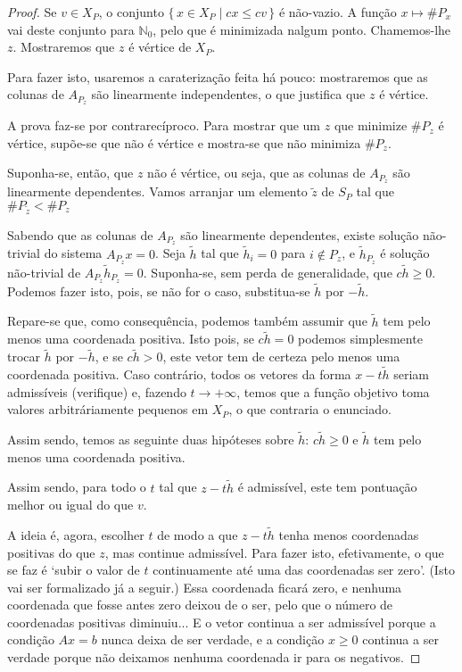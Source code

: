 \documentclass{article}
\newcommand{\N}{\mathbb{N}}
\theoremstyle{definition}
\begin{document}
	\begin{proof}
	Se $v \in X_P$, o conjunto $\{\,x \in X_P \mid cx \leq cv\,\}$ é não-vazio. A função $x \mapsto \#P_x$ vai deste conjunto para $\N_0$, pelo que é minimizada nalgum ponto. Chamemos-lhe $z$. Mostraremos que $z$ é vértice de $X_P$.
	
	Para fazer isto, usaremos a caraterização feita há pouco: mostraremos que as colunas de $A_{P_z}$ são linearmente independentes, o que justifica que $z$ é vértice.
	
	A prova faz-se por contrarecíproco. Para mostrar que um $z$ que minimize $\#P_z$ é vértice, supõe-se que não é vértice e mostra-se que não minimiza $\#P_z$.
	
	Suponha-se, então, que $z$ não é vértice, ou seja, que as colunas de $A_{P_z}$ são linearmente dependentes. Vamos arranjar um elemento $\tilde z$ de $S_P$ tal que $\#P_{\tilde z} < \#P_z$
	
	Sabendo que as colunas de $A_{P_z}$ são linearmente dependentes, existe solução não-trivial do sistema $A_{P_z} x = 0$. Seja $\tilde h$ tal que $\tilde h_i = 0$ para $i \not \in P_z$, e $\tilde h_{P_z}$ é solução não-trivial de $A_{P_z} \tilde h_{P_z} = 0$. Suponha-se, sem perda de generalidade, que $c \tilde h \geq 0$. Podemos fazer isto, pois, se não for o caso, substitua-se $\tilde h$ por $-\tilde h$.
	
	Repare-se que, como consequência, podemos também assumir que $\tilde h$ tem pelo menos uma coordenada positiva. Isto pois, se $c \tilde h = 0$ podemos simplesmente trocar $\tilde h$ por $- \tilde h$, e se $c \tilde h > 0$, este vetor tem de certeza pelo menos uma coordenada positiva. Caso contrário, todos os vetores da forma $x - t \tilde h$ seriam admissíveis (verifique) e, fazendo $t \rightarrow +\infty$, temos que a função objetivo toma valores arbitráriamente pequenos em $X_P$, o que contraria o enunciado.
	
	Assim sendo, temos as seguinte duas hipóteses sobre $\tilde h$: $c \tilde h \geq 0$ e $\tilde h$ tem pelo menos uma coordenada positiva.
	
	Assim sendo, para todo o $t$ tal que $z - t \tilde h$ é admissível, este tem pontuação melhor ou igual do que $v$.
	
	A ideia é, agora, escolher $t$ de modo a que $z - t \tilde h$ tenha menos coordenadas positivas do que $z$, mas continue admissível. Para fazer isto, efetivamente, o que se faz é `subir o valor de $t$ continuamente até uma das coordenadas ser zero'. (Isto vai ser formalizado já a seguir.) Essa coordenada ficará zero, e nenhuma coordenada que fosse antes zero deixou de o ser, pelo que o número de coordenadas positivas diminuiu... E o vetor continua a ser admissível porque a condição $Ax = b$ nunca deixa de ser verdade, e a condição $x \geq 0$ continua a ser verdade porque não deixamos nenhuma coordenada ir para os negativos.
	

\end{proof}
\end{document}
